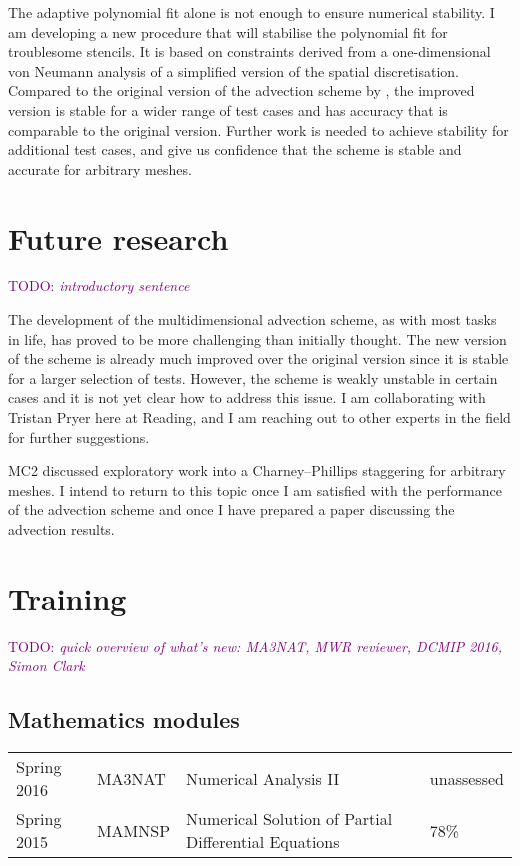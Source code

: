 \documentclass[a4paper,11pt]{article}
\newcommand{\TODO}[1]{\textcolor{purple}{TODO: \emph{#1}}}
\begin{document}
The adaptive polynomial fit alone is not enough to ensure numerical stability.  I am developing a new procedure that will stabilise the polynomial fit for troublesome stencils.  It is based on constraints derived from a one-dimensional von Neumann analysis of a simplified version of the spatial discretisation.  Compared to the original version of the advection scheme by \citet{weller-shahrokhi2014}, the improved version is stable for a wider range of test cases and has accuracy that is comparable to the original version.  Further work is needed to achieve stability for additional test cases, and give us confidence that the scheme is stable and accurate for arbitrary meshes.


\section{Future research}
\TODO{introductory sentence}

The development of the multidimensional advection scheme, as with most tasks in life, has proved to be more challenging than initially thought.  The new version of the scheme is already much improved over the original version since it is stable for a larger selection of tests.  However, the scheme is weakly unstable in certain cases and it is not yet clear how to address this issue.  I am collaborating with Tristan Pryer here at Reading, and I am reaching out to other experts in the field for further suggestions.

MC2 discussed exploratory work into a Charney--Phillips staggering for arbitrary meshes.  I intend to return to this topic once I am satisfied with the performance of the advection scheme and once I have prepared a paper discussing the advection results.



\section{Training}
\TODO{quick overview of what's new: MA3NAT, MWR reviewer, DCMIP 2016, Simon Clark}

\subsection*{Mathematics modules}
\begin{tabular}{l l l l}
Spring 2016	& MA3NAT & Numerical Analysis II & unassessed \\
Spring 2015	& MAMNSP & Numerical Solution of Partial Differential Equations  & 78\% \\
\end{tabular}
\end{document}
